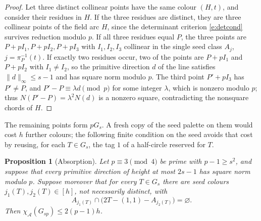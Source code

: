 \documentclass[11pt]{article}
\newtheorem{proposition}[theorem]{Proposition}
\theoremstyle{definition}
\theoremstyle{remark}
\newcommand{\height}[1]{\lVert #1\rVert_\infty}
\renewcommand{\ge}{\geqslant}
\renewcommand{\le}{\leqslant}
\renewcommand\emptyset{\varnothing}
\begin{document}
\begin{proof}
Let three distinct collinear points have the same colour \((H,t)\), and
consider their residues in \(H\).  If the three residues are distinct,
they are three collinear points of the field arc \(H\), since the
determinant criterion \eqref{e:detcond} survives reduction modulo
\(p\).  If all three residues equal \(P\), the three points are
\(P+pI_1,P+pI_2,P+pI_3\) with \(I_1,I_2,I_3\) collinear in the single
seed class \(A_j\), \(j=\pi_P^{-1}(t)\).  If exactly two residues occur,
two of the points are \(P+pI_1\) and \(P+pI_2\) with \(I_1\ne I_2\), so
the primitive direction \(d\) of the line satisfies
\(\height{d}\le s-1\) and has square norm modulo \(p\).  The third point
\(P'+pI_3\) has \(P'\ne P\), and \(P'-P\equiv\lambda d\pmod p\) for
some integer \(\lambda\), which is nonzero modulo \(p\); thus
\(N(P'-P)=\lambda^2N(d)\) is a nonzero square, contradicting the
nonsquare chords of \(H\).
\end{proof}

The remaining points form \(pG_s\).  A fresh copy of the seed palette on
them would cost \(h\) further colours; the following finite condition on
the seed avoids that cost by reusing, for each \(T\in G_s\), the tag
\(1\) of a half-circle reserved for \(T\).

\begin{proposition}[Absorption]\label{prop:absorb}
Let \(p\equiv3\pmod4\) be prime with \(p-1\ge s^2\), and suppose that
every primitive direction of height at most \(2s-1\) has square norm
modulo \(p\).  Suppose moreover that for every \(T\in G_s\) there are
seed colours \(j_1(T),j_2(T)\in[h]\), not necessarily distinct, with
\begin{equation}\label{eq:reflection}
  A_{j_1(T)}\cap\bigl(2T-(1,1)-A_{j_2(T)}\bigr)=\emptyset.
\end{equation}
Then \(\chi_{\mathcal{A}}(G_{sp})\le2(p-1)h\).
\end{proposition}
\end{document}
